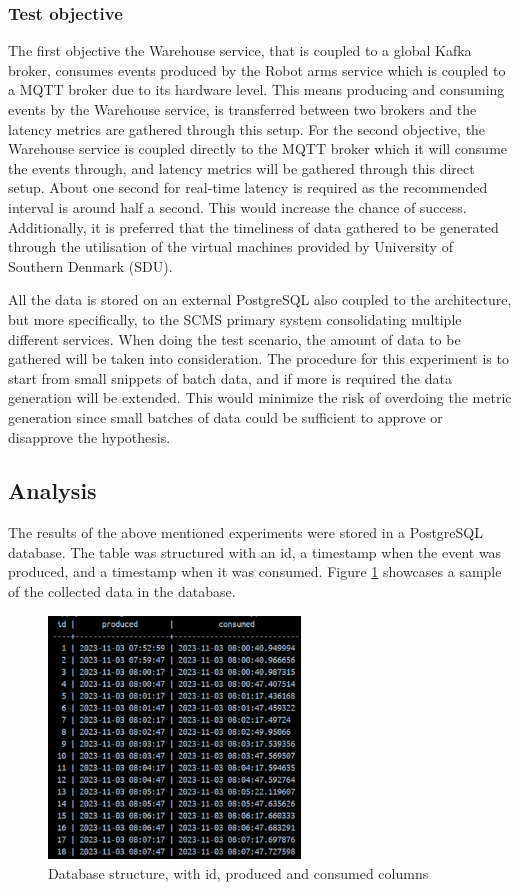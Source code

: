 \subsubsection{Test objective}
The first objective the Warehouse service, that is coupled to a global Kafka broker, consumes events produced by the Robot arms service which is coupled to a MQTT broker due to its hardware level. This means producing and consuming events by the Warehouse service, is transferred between two brokers and the latency metrics are gathered through this setup. For the second objective, the Warehouse service is coupled directly to the MQTT broker which it will consume the events through, and latency metrics will be gathered through this direct setup.
About one second for real-time latency is required as the recommended interval is around half a second. This would increase the chance of success. Additionally, it is preferred that the timeliness of data gathered to be generated through the utilisation of the virtual machines provided by University of Southern Denmark (SDU).

All the data is stored on an external PostgreSQL also coupled to the architecture, but more specifically, to the SCMS primary system consolidating multiple different services. When doing the test scenario, the amount of data to be gathered will be taken into consideration. The procedure for this experiment is to start from small snippets of batch data, and if more is required the data generation will be extended. This would minimize the risk of overdoing the metric generation since small batches of data could be sufficient to approve or disapprove the hypothesis.  

\subsection{Analysis}
\label{sec:analysis}
The results of the above mentioned experiments were stored in a PostgreSQL database. The table was structured with an id, a timestamp when the event was produced, and a timestamp when it was consumed. Figure \ref{fig:timestamp-data} showcases a sample of the collected data in the database. 
\begin{figure}[h]
    \centering
    \includegraphics[width=190pt]{images/timestamp-data.png}
    \caption{Database structure, with id, produced and consumed columns}
    \label{fig:timestamp-data}
\end{figure}

